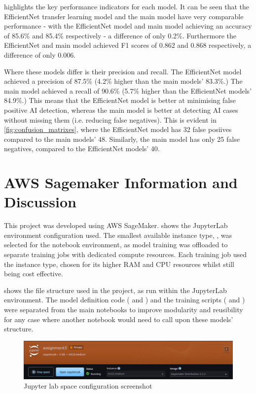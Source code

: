   highlights the key performance indicators for each model. It can be seen that the EfficientNet transfer learning model and the main model have very comparable performance - with the EfficientNet model and main model achieving an accuracy of 85.6\% and 85.4\% respectively - a difference of only 0.2\%. Furthermore the EfficientNet and main model achieved F1 scores of 0.862 and 0.868 respectively, a difference of only 0.006.

Where these models differ is their precision and recall. The EfficientNet model achieved a precision of 87.5\% (4.2\% higher than the main models' 83.3\%.) The main model achieved a recall of 90.6\% (5.7\% higher than the EfficientNet models' 84.9\%.) This means that the EfficientNet model is better at minimising false positive AI detection, whereas the main model is better at detecting AI cases without missing them (i.e. reducing false negatives). This is evident in \cref{fig:confusion_matrixes}, where the EfficientNet model has 32 false posiives compared to the main models' 48. Similarly, the main model has only 25 false negatives, compared to the EfficientNet models' 40.

\newpage

\section{AWS Sagemaker Information and Discussion} \label{sec:aws_reflection}

This project was developed using AWS SageMaker.  shows the JupyterLab environment configuration used. The smallest available instance type, , was selected for the notebook environment, as model training was offloaded to separate training jobs with dedicated compute resources. Each training job used the  instance type, chosen for its higher RAM and CPU resources whilst still being cost effective.

 shows the file structure used in the project, as run within the JupyterLab environment. The model definition code ( and ) and the training scripts ( and ) were separated from the main notebooks to improve modularity and reusibility for any case where another notebook would need to call upon these models' structure.


\begin{figure}[h]
    \centering
    \includegraphics[width=0.8\linewidth]{figures/jupyter_lab_space_config.png} %
    \centering
    \caption{Jupyter lab space configuration screenshot} %
    \label{fig:jupyter_lab_space_config} %
\end{figure}

